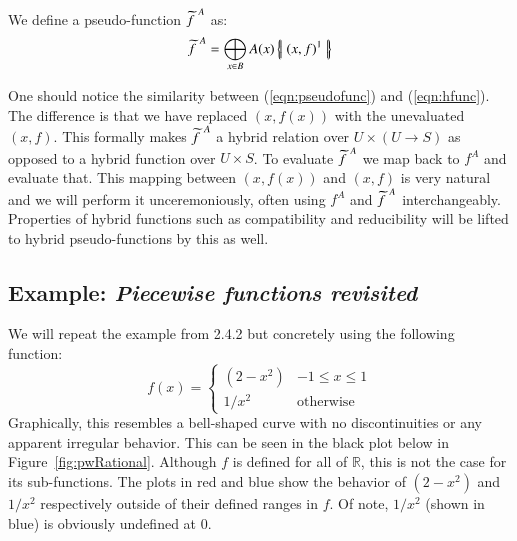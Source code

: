 \begin{definition}
	We define a pseudo-function $\pseudo{f\;}^A$ as:
	\begin{equation}
		\label{eqn:pseudofunc}
 		\pseudo{f\;}^A = \bigoplus_{x \in B} A(x) \hset{(x,f)^1}
	\end{equation}
\end{definition}


One should notice the similarity between (\ref{eqn:pseudofunc}) and (\ref{eqn:hfunc}).
The difference is that we have replaced $(x, f(x))$ with the unevaluated $(x,f)$.
This formally makes $\pseudo{f\;}^A$ a hybrid relation over $U \times (U \to S)$ as opposed to 
a hybrid function over $U \times S$.
To evaluate $\pseudo{f\;}^A$ we map back to $f^A$ and evaluate that.
This mapping between $(x,f(x))$ and $(x,f)$ is very natural and we will perform it unceremoniously,
often using $f^A$ and $\pseudo{f\;}^A$ interchangeably. 
Properties of hybrid functions such as compatibility and reducibility will be lifted to hybrid pseudo-functions by this as well.


\subsection{Example: \emph{Piecewise functions revisited}}


We will repeat the example from 2.4.2 but concretely using the following function:
\begin{equation*}
	f(x) = \begin{cases}
		(2-x^2) & -1 \leq x \leq 1\\
		1/x^2 & \text{otherwise}
	\end{cases}
\end{equation*}
Graphically, this resembles a bell-shaped curve with no discontinuities or any apparent irregular behavior. 
This can be seen in the black plot below in Figure~\ref{fig:pwRational}.
Although $f$ is defined for all of $\mathbb{R}$, this is not the case for its sub-functions. 
The plots in red and blue show the behavior of $(2-x^2)$ and $1/x^2$ respectively outside of their defined ranges in $f$.
Of note, $1/x^2$ (shown in blue) is obviously undefined at 0.


